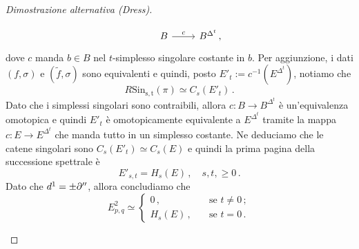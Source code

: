 \begin{proof}[Dimostrazione alternativa (Dress)]
\begin{enumerate}
\begin{equation*}
\begin{tikzcd}
				& B \ar[r, "c"] & B^{\Delta^{t}}\,,
			\end{tikzcd}
			\end{equation*}
			dove $c$ manda $b \in B$ nel $t$-simplesso singolare costante in $b$.
			Per aggiunzione, i dati $(f,\sigma)$ e $(\widetilde{f},\sigma)$
			sono equivalenti e quindi, posto $E'_{t} := c^{-1}\left( E^{\Delta^{t}} \right)$,
			notiamo che 
			\begin{equation*}
				R\mathrm{Sin_{s,t}}(\pi) \simeq C_{s}(E'_{t})\,.
			\end{equation*}
			Dato che i simplessi singolari sono contraibili,
			allora $c : B \to B^{\Delta^{t}}$ è un'equivalenza omotopica
			e quindi $E'_{t}$ è omotopicamente equivalente a $E^{\Delta^{t}}$
			tramite la mappa $c : E \to E^{\Delta^{t}}$ che manda tutto in un simplesso costante.
			Ne deduciamo che le catene singolari sono $C_{s}(E'_{t}) \simeq C_{s}(E)$
			e quindi la prima pagina della successione spettrale è
			\begin{equation*}
				E'_{s,t} = H_{s}(E)\,, \quad s,t, \ge 0\,.
			\end{equation*}
			Dato che $d^{1} = \pm \partial''$, allora concludiamo che
			\begin{equation*}
				E^{2}_{p,q} \simeq
				\begin{cases}
					0\,, \quad &\text{se } t \ne 0\,; \\
					H_{s}(E)\,, \quad &\text{se } t = 0\,.
				\end{cases}
			\end{equation*}
			

\end{enumerate}
\end{proof}
